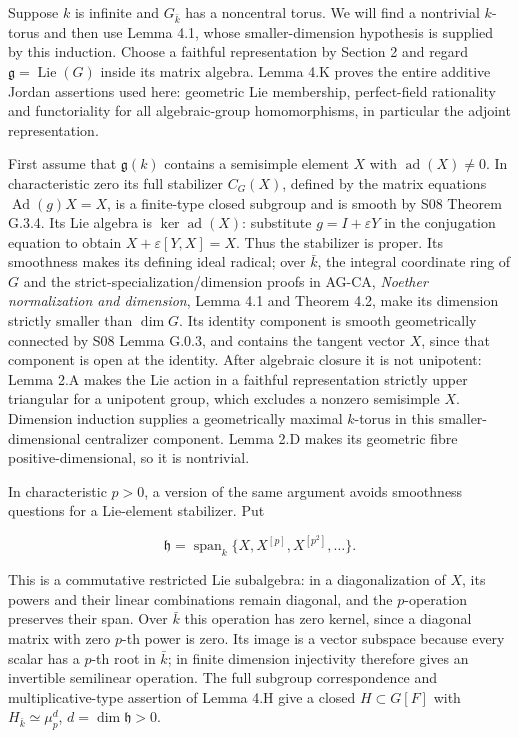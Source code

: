 \documentclass[11pt,a4paper,openany]{report}
\begin{document}
Suppose \(k\) is infinite and \(G_{\bar k}\) has a noncentral torus. We will find a nontrivial \(k\)-torus and then use Lemma 4.1, whose smaller-dimension hypothesis is supplied by this induction. Choose a faithful representation by Section 2 and regard \(\mathfrak g=\operatorname{Lie}(G)\) inside its matrix algebra. Lemma 4.K proves the entire additive Jordan assertions used here: geometric Lie membership, perfect-field rationality and functoriality for all algebraic-group homomorphisms, in particular the adjoint representation.

First assume that \(\mathfrak g(k)\) contains a semisimple element \(X\) with \(\operatorname{ad}(X)\ne0\). In characteristic zero its full stabilizer \(C_G(X)\), defined by the matrix equations \(\operatorname{Ad}(g)X=X\), is a finite-type closed subgroup and is smooth by S08 Theorem G.3.4. Its Lie algebra is \(\ker\operatorname{ad}(X)\): substitute \(g=I+\varepsilon Y\) in the conjugation equation to obtain \(X+\varepsilon[Y,X]=X\). Thus the stabilizer is proper. Its smoothness makes its defining ideal radical; over \(\bar k\), the integral coordinate ring of \(G\) and the strict-specialization/dimension proofs in AG-CA, \emph{Noether normalization and dimension}, Lemma 4.1 and Theorem 4.2, make its dimension strictly smaller than \(\dim G\). Its identity component is smooth geometrically connected by S08 Lemma G.0.3, and contains the tangent vector \(X\), since that component is open at the identity. After algebraic closure it is not unipotent: Lemma 2.A makes the Lie action in a faithful representation strictly upper triangular for a unipotent group, which excludes a nonzero semisimple \(X\). Dimension induction supplies a geometrically maximal \(k\)-torus in this smaller-dimensional centralizer component. Lemma 2.D makes its geometric fibre positive-dimensional, so it is nontrivial.

In characteristic \(p>0\), a version of the same argument avoids smoothness questions for a Lie-element stabilizer. Put

\[
\mathfrak h=\operatorname{span}_k\{X,X^{[p]},X^{[p^2]},\ldots\}.
\]

This is a commutative restricted Lie subalgebra: in a diagonalization of \(X\), its powers and their linear combinations remain diagonal, and the \(p\)-operation preserves their span. Over \(\bar k\) this operation has zero kernel, since a diagonal matrix with zero \(p\)-th power is zero. Its image is a vector subspace because every scalar has a \(p\)-th root in \(\bar k\); in finite dimension injectivity therefore gives an invertible semilinear operation. The full subgroup correspondence and multiplicative-type assertion of Lemma 4.H give a closed \(H\subset G[F]\) with \(H_{\bar k}\simeq\mu_p^d\), \(d=\dim\mathfrak h>0\).
\end{document}
